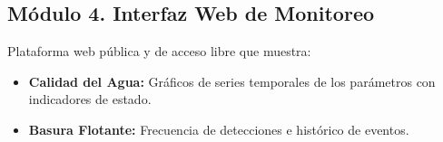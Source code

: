 \subsection{Módulo 4. Interfaz Web de Monitoreo}
Plataforma web pública y de acceso libre que muestra:
\begin{itemize}
\item \textbf{Calidad del Agua:} Gráficos de series temporales de los parámetros con indicadores de estado.
\item \textbf{Basura Flotante:} Frecuencia de detecciones e histórico de eventos.
\end{itemize}

